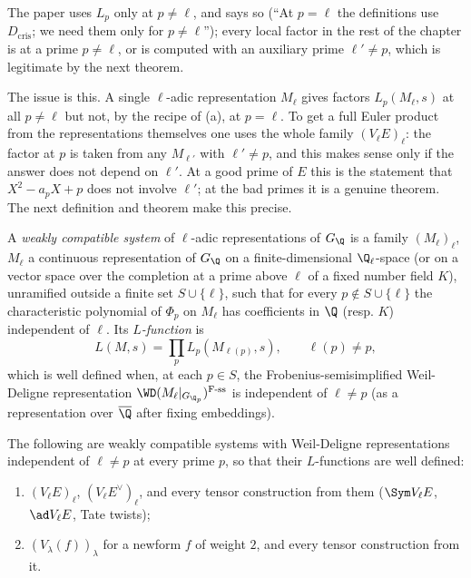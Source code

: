 The paper uses $L_p$ only at $p\ne\ell$, and says so (``At $p=\ell$ the definitions use $D_{\mathrm{cris}}$; we need them only for $p\ne\ell$''); every local factor
in the rest of the chapter is at a prime $p\ne\ell$, or is computed with an auxiliary prime $\ell'\ne p$, which is legitimate by the next theorem.

The issue is this. A single $\ell$-adic representation $M_\ell$ gives factors $L_p(M_\ell,s)$ at all $p\ne\ell$ but not, by the recipe of (a), at
$p=\ell$. To get a full Euler product from the representations themselves one uses the whole family $(V_\ell E)_\ell$: the factor at $p$ is taken from any $M_{\ell'}$ with
$\ell'\ne p$, and this makes sense only if the answer does not depend on $\ell'$. At a good prime of $E$ this is the statement that $X^2-a_pX+p$ does not involve $\ell'$; at the
bad primes it is a genuine theorem. The next definition and theorem make this precise.

\begin{definition}\label{def:lfunctions:compatible-system}
A \emph{weakly compatible system} of $\ell$-adic representations of $G_\Q$ is a family $(M_\ell)_\ell$, $M_\ell$ a continuous representation of $G_\Q$ on a
finite-dimensional $\Q_\ell$-space (or on a vector space over the completion at a prime above $\ell$ of a fixed number field $K$), unramified outside a finite set
$S\cup\{\ell\}$, such that for every $p\notin S\cup\{\ell\}$ the characteristic polynomial of $\Phi_p$ on $M_\ell$ has coefficients in $\Q$ (resp. $K$) independent of $\ell$. Its
\emph{$L$-function} is
\[
L(M,s)=\prod_pL_p(M_{\ell(p)},s),\qquad\ell(p)\ne p,
\]
which is well defined when, at each $p\in S$, the Frobenius-semisimplified Weil-Deligne representation $\WD(M_\ell|_{G_{\Q_p}})^{\mathrm{F\text{-}ss}}$ is independent of
$\ell\ne p$ (as a representation over $\overline\Q$ after fixing embeddings).
\end{definition}

\begin{theorem}\label{thm:lfunctions:compatible-system}
The following are weakly compatible systems with Weil-Deligne representations independent of $\ell\ne p$ at every prime $p$, so that their $L$-functions are
well defined:
\begin{enumerate}[label=(\roman*)]
\item $(V_\ell E)_\ell$, $(V_\ell E^\vee)_\ell$, and every tensor construction from them ($\Sym V_\ell E$, $\ad V_\ell E$, Tate twists);
\item $(V_\lambda(f))_\lambda$ for a newform $f$ of weight $2$, and every tensor construction from it.
\end{enumerate}
\end{theorem}

